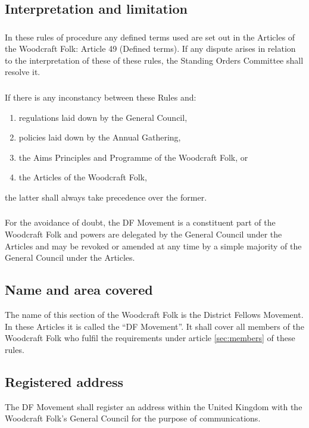 \documentclass[a4paper, 12pt]{report}
\begin{document}
\subsection{Interpretation and limitation}
\subsubsection{}
In these rules of procedure any defined terms used are set out in the Articles of the Woodcraft Folk: Article 49 (Defined terms). If any dispute arises in relation to the interpretation of these of these rules, the Standing Orders Committee shall resolve it.
\subsubsection{}
If there is any inconstancy between these Rules and:
\begin{enumerate}[\hspace{0.5cm}(a)]
\item regulations laid down by the General Council,
\item policies laid down by the Annual Gathering,
\item the Aims Principles and Programme of the Woodcraft Folk, or
\item the Articles of the Woodcraft Folk,
\end{enumerate}
the latter shall always take precedence over the former.

\subsubsection{}
For the avoidance of doubt, the DF Movement is a constituent part of the Woodcraft Folk and powers are delegated by the General Council under the Articles and may be revoked or amended at any time by a simple majority of the General Council under the Articles.

\subsection{Name and area covered}
The name of this section of the Woodcraft Folk is the District Fellows Movement. In these Articles it is called the ``DF Movement''. It shall cover all members of the Woodcraft Folk who fulfil the requirements under article \ref{sec:members} of these rules.

\subsection{Registered address}
The DF Movement shall register an address within the United Kingdom with the Woodcraft Folk's General Council for the purpose of communications.
\end{document}
